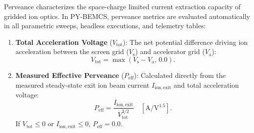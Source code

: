 \documentclass[11pt,a4paper]{article}
\newcommand{\PYBEMCS}{PY-BEMCS}
\begin{document}
Perveance characterizes the space-charge limited current extraction capacity of gridded ion optics. In \PYBEMCS{}, perveance metrics are evaluated automatically in all parametric sweeps, headless executions, and telemetry tables:

\begin{enumerate}[nosep]
    \item \textbf{Total Acceleration Voltage} ($V_{\mathrm{tot}}$):
    The net potential difference driving ion acceleration between the screen grid ($V_{\mathrm{s}}$) and accelerator grid ($V_{\mathrm{a}}$):
    \begin{equation}
        V_{\mathrm{tot}} = \max(V_{\mathrm{s}} - V_{\mathrm{a}}, \, 0.0).
    \end{equation}
    
    \item \textbf{Measured Effective Perveance} ($P_{\mathrm{eff}}$):
    Calculated directly from the measured steady-state exit ion beam current $I_{\mathrm{ion,exit}}$ and total acceleration voltage:
    \begin{equation}
        P_{\mathrm{eff}} = \frac{I_{\mathrm{ion,exit}}}{V_{\mathrm{tot}}^{3/2}} \quad \left[\si{\ampere\per\volt^{1.5}}\right].
    \end{equation}
    If $V_{\mathrm{tot}} \le 0$ or $I_{\mathrm{ion,exit}} \le 0$, $P_{\mathrm{eff}} = 0.0$.
    

\end{enumerate}
\end{document}
